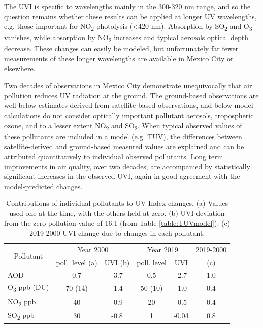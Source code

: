 \documentclass[journal=jacsat,manuscript=article]{achemso}
\begin{document}
The UVI is specific to wavelengths mainly in the 300-320 nm range, and
so the question remains whether these results can be applied at longer
UV wavelengths, e.g. those important for NO\textsubscript{2} photolysis
(\textless{}420 nm). Absorption by SO\textsubscript{2} and
O\textsubscript{3} vanishes, while absorption by NO\textsubscript{2}
increases and typical aerosols optical depth decrease. These changes can
easily be modeled, but unfortunately far fewer measurements of these
longer wavelengths are available in Mexico City or elsewhere.

Two decades of observations in Mexico City demonstrate unequivocally
that air pollution reduces UV radiation at the ground. The ground-based
observations are well below estimates derived from satellite-based
observations, and below model calculations do not consider optically
important pollutant aerosols, tropospheric ozone, and to a lesser extent
NO\textsubscript{2} and SO\textsubscript{2}. When typical observed
values of these pollutants are included in a model (e.g. TUV), the
differences between satellite-derived and ground-based measured values
are explained and can be attributed quantitatively to individual
observed pollutants. Long term improvements in air quality, over two
decades, are accompanied by statistically significant increases in the
observed UVI, again in good agreement with the model-predicted changes.


\begin{table}[H]
  \centering
  \begin{tabular}{lccccc}
    \hline
    \multicolumn{1}{c}{\multirow{2}{*}{Pollutant}} & \multicolumn{2}{c}{Year 2000} & \multicolumn{2}{c}{Year 2019} & 2019-2000                 \\ \cline{2-6}
    \multicolumn{1}{c}{}                           & poll. level (a)               & UVI (b)                       & poll. level & UVI   & (c) \\ \hline
    AOD                                            & 0.7                           & -3.7                          & 0.5         & -2.7  & 1.0 \\
    O\textsubscript{3} ppb (DU)                    & 70 (14)                       & -1.4                          & 50 (10)     & -1.0  & 0.4 \\
    NO\textsubscript{2} ppb                        & 40                            & -0.9                          & 20          & -0.5  & 0.4 \\
    SO\textsubscript{2} ppb                        & 30                            & -0.8                          & 1           & -0.04 & 0.8 \\ \hline
  \end{tabular}
  \caption{Contributions of individual pollutants to UV Index changes. (a) Values used one at the time, with the others held at zero. (b) UVI deviation from the zero-pollution value of 16.1 (from Table \ref{table:TUVmodel}). (c) 2019-2000 UVI change due to changes in each pollutant.}
  \label{table:year2000-2019}
\end{table}
\end{document}

